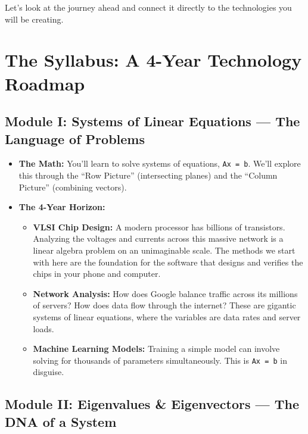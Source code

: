 \documentclass[
  letterpaper,
  DIV=11,
  numbers=noendperiod]{scrreprt}
\providecommand{\tightlist}{%
  \setlength{\itemsep}{0pt}\setlength{\parskip}{0pt}}
\begin{document}
Let's look at the journey ahead and connect it directly to the
technologies you will be creating.

\section{The Syllabus: A 4-Year Technology
Roadmap}\label{the-syllabus-a-4-year-technology-roadmap}

\subsection{Module I: Systems of Linear Equations --- The Language of
Problems}\label{module-i-systems-of-linear-equations-the-language-of-problems}

\begin{itemize}
\tightlist
\item
  \textbf{The Math:} You'll learn to solve systems of equations,
  \texttt{Ax\ =\ b}. We'll explore this through the ``Row Picture''
  (intersecting planes) and the ``Column Picture'' (combining vectors).
\item
  \textbf{The 4-Year Horizon:}

  \begin{itemize}
  \tightlist
  \item
    \textbf{VLSI Chip Design:} A modern processor has billions of
    transistors. Analyzing the voltages and currents across this massive
    network is a linear algebra problem on an unimaginable scale. The
    methods we start with here are the foundation for the software that
    designs and verifies the chips in your phone and computer.
  \item
    \textbf{Network Analysis:} How does Google balance traffic across
    its millions of servers? How does data flow through the internet?
    These are gigantic systems of linear equations, where the variables
    are data rates and server loads.
  \item
    \textbf{Machine Learning Models:} Training a simple model can
    involve solving for thousands of parameters simultaneously. This is
    \texttt{Ax\ =\ b} in disguise.
  \end{itemize}
\end{itemize}

\subsection{Module II: Eigenvalues \& Eigenvectors --- The DNA of a
System}\label{module-ii-eigenvalues-eigenvectors-the-dna-of-a-system}
\end{document}
